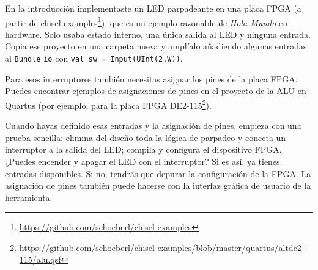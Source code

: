 \documentclass[%
    10pt,
    headinclude, footinclude=false,
    openright, %
    notitlepage,
    cleardoublepage=empty,
    headsepline,
    numbers=noenddot,
    bibliography=totoc, index=totoc,
    ]{scrbook}
\newcommand{\code}[1]{{\lstinline[basicstyle=\small\ttfamily]{#1}}}
\newcommand{\myref}[2]{\href{#1}{#2}}
\renewcommand{\myref}[2]{{#2}{\footnote{\url{#1}}}}
\begin{document}
En la introducción implementaste un LED parpadeante en una placa FPGA
(a partir de \myref{https://github.com/schoeberl/chisel-examples}{chisel-examples}), que es un ejemplo
razonable de \emph{Hola Mundo} en hardware. Solo usaba estado interno, una única salida al LED y ninguna
entrada.
Copia ese proyecto en una carpeta nueva y amplíalo añadiendo algunas entradas al \code{Bundle} \code{io}
con \code{val sw = Input(UInt(2.W))}.



\noindent Para esos interruptores también necesitas asignar los pines de la placa FPGA.
Puedes encontrar ejemplos de asignaciones de pines en el proyecto de la ALU en Quartus (por ejemplo, para la
\myref{https://github.com/schoeberl/chisel-examples/blob/master/quartus/altde2-115/alu.qsf}{placa FPGA
DE2-115}).


Cuando hayas definido esas entradas y la asignación de pines, empieza con una prueba sencilla:
elimina del diseño toda la lógica de parpadeo y conecta un interruptor a la salida del LED;
compila y configura el dispositivo FPGA. ¿Puedes encender y apagar el LED con el interruptor?
Si es así, ya tienes entradas disponibles. Si no, tendrás que depurar la configuración de la FPGA.
La asignación de pines también puede hacerse con la interfaz gráfica de usuario de la herramienta.

\end{document}
